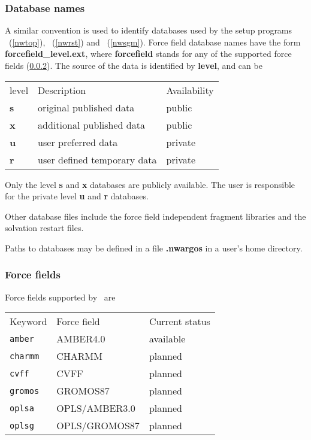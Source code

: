\subsubsection{Database names}
\par
A similar convention is used to identify databases used by the setup programs
\nwtop\ (\ref{nwtop}), \nwrst\ (\ref{nwrst}) and \nwsgm\ (\ref{nwsgm}).
Force field database names have the form
{\bf forcefield\_level.ext}, where {\bf forcefield} stands for any of the
supported force fields (\ref{forcefields}). The source
of the data is identified by {\bf level}, and can be 
\begin{center}
\begin{tabular}{lll}
\hline
level   & Description                 & Availability \\
{\bf s} & original published data     & public       \\
{\bf x} & additional published data   & public       \\
{\bf u} & user preferred data         & private      \\
{\bf r} & user defined temporary data & private    \\
\hline
\end{tabular}
\end{center}
\par
Only the level {\bf s} and {\bf x} databases are publicly available. 
The user is responsible for the private level {\bf u} and {\bf r} databases.
\par
Other database files include the force field independent fragment libraries 
and the solvation restart files.
\par
Paths to databases may be defined in a file {\bf .nwargos} in a user's 
home directory.
\subsubsection{Force fields}
\label{forcefields}
Force fields supported by \nwargos\ are
\begin{center}
\begin{tabular}{lll}
\hline
Keyword      & Force field   & Current status \\
{\tt amber}  & AMBER4.0      & available      \\
{\tt charmm} & CHARMM        & planned        \\
{\tt cvff}   & CVFF          & planned        \\
{\tt gromos} & GROMOS87      & planned        \\
{\tt oplsa}  & OPLS/AMBER3.0 & planned        \\
{\tt oplsg}  & OPLS/GROMOS87 & planned        \\
\hline
\end{tabular}
\end{center}  
